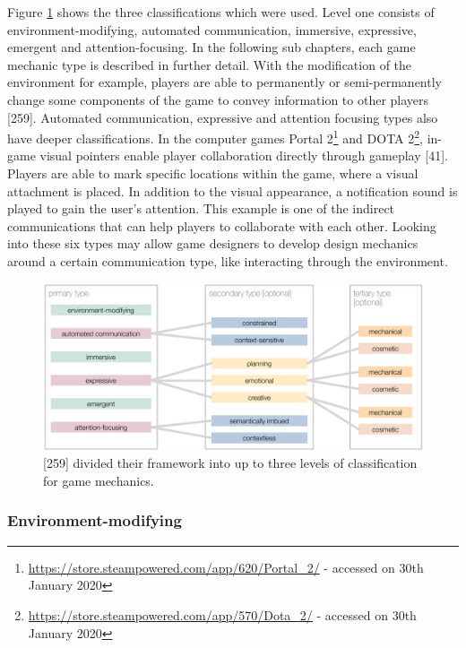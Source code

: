 Figure \ref{fig:framework_cooperative_communication_mechanics} shows the three classifications which were used. 
Level one consists of environment-modifying, automated communication, immersive, expressive, emergent and attention-focusing.
In the following sub chapters, each game mechanic type is described in further detail.
With the modification of the environment for example, players are able to permanently or semi-permanently change some components of the game to convey information to other players \textcite{Toups2014ATheory}[259]. 
Automated communication, expressive and attention focusing types also have deeper classifications.
In the computer games Portal 2\footnote{\url{https://store.steampowered.com/app/620/Portal_2/} - accessed on 30th January 2020} and DOTA 2\footnote{\url{https://store.steampowered.com/app/570/Dota_2/} - accessed on 30th January 2020}, in-game visual pointers enable player collaboration directly through gameplay \autocite{Vaddi2016Investigating2}[41]. 
Players are able to mark specific locations within the game, where a visual attachment is placed. In addition to the visual appearance, a notification sound is played to gain the user’s attention. This example is one of the indirect communications that can help players to collaborate with each other. Looking into these six types may allow game designers to develop design mechanics around a certain communication type, like interacting through the environment.


\begin{figure}
    \centering
    \includegraphics[scale=0.5]{images/framework_cooperative_communication_mechanics.png}
    \caption{\textcite{Toups2014ATheory}[259] divided their framework into up to three levels of classification for game mechanics.}
    \label{fig:framework_cooperative_communication_mechanics}
\end{figure}

\subsubsection{Environment-modifying}
\label{section:Environment-modifying}

